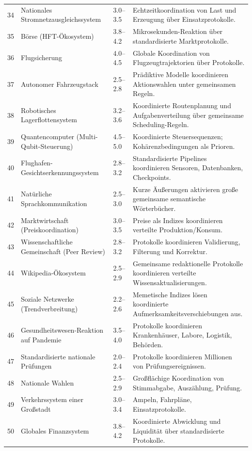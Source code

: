 \documentclass[13pt,a4paper]{article}
\begin{document}
\begin{longtable}{|p{0.8cm}|p{6.2cm}|p{3.0cm}|p{5.7cm}|}
		34 & Nationales Stromnetzausgleichssystem & 3.0--3.5 & Echtzeitkoordination von Last und Erzeugung über Einsatzprotokolle. \\
		35 & Börse (HFT-Ökosystem) & 3.8--4.2 & Mikrosekunden-Reaktion über standardisierte Marktprotokolle. \\
		36 & Flugsicherung & 4.0--4.5 & Globale Koordination von Flugzeugtrajektorien über Protokolle. \\
		37 & Autonomer Fahrzeugstack & 2.5--2.8 & Prädiktive Modelle koordinieren Aktionswahlen unter gemeinsamen Regeln. \\
		38 & Robotisches Lagerflottensystem & 3.2--3.6 & Koordinierte Routenplanung und Aufgabenverteilung über gemeinsame Scheduling-Regeln. \\
		39 & Quantencomputer (Multi-Qubit-Steuerung) & 4.5--5.0 & Koordinierte Steuersequenzen; Kohärenzbedingungen als Prioren. \\
		40 & Flughafen-Gesichtserkennungssystem & 2.8--3.2 & Standardisierte Pipelines koordinieren Sensoren, Datenbanken, Checkpoints. \\
		41 & Natürliche Sprachkommunikation & 2.5--3.0 & Kurze Äußerungen aktivieren große gemeinsame semantische Wörterbücher. \\
		42 & Marktwirtschaft (Preiskoordination) & 3.0--3.5 & Preise als Indizes koordinieren verteilte Produktion/Konsum. \\
		43 & Wissenschaftliche Gemeinschaft (Peer Review) & 2.8--3.2 & Protokolle koordinieren Validierung, Filterung und Korrektur. \\
		44 & Wikipedia-Ökosystem & 2.5--2.9 & Gemeinsame redaktionelle Protokolle koordinieren verteilte Wissensaktualisierungen. \\
		45 & Soziale Netzwerke (Trendverbreitung) & 2.2--2.6 & Memetische Indizes lösen koordinierte Aufmerksamkeitsverschiebungen aus. \\
		46 & Gesundheitswesen-Reaktion auf Pandemie & 3.5--4.0 & Protokolle koordinieren Krankenhäuser, Labore, Logistik, Behörden. \\
		47 & Standardisierte nationale Prüfungen & 2.0--2.4 & Protokolle koordinieren Millionen von Prüfungsereignissen. \\
		48 & Nationale Wahlen & 2.5--2.9 & Großflächige Koordination von Stimmabgabe, Auszählung, Prüfung. \\
		49 & Verkehrssystem einer Großstadt & 3.0--3.4 & Ampeln, Fahrpläne, Einsatzprotokolle. \\
		50 & Globales Finanzsystem & 3.8--4.2 & Koordinierte Abwicklung und Liquidität über standardisierte Protokolle. \\
		\hline
	\end{longtable}
	
\end{document}
